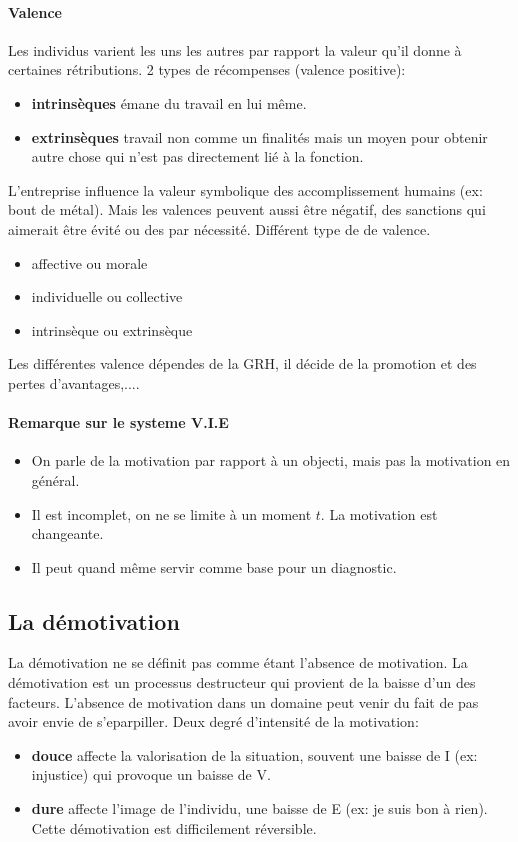 \documentclass[11pt]{article} %
\begin{document}
		 \paragraph{Valence} Les individus varient les uns les autres par rapport la valeur qu'il donne à 
		 certaines rétributions. 2 types de récompenses (valence positive):
		 \begin{itemize}
		 	\item \textbf{intrinsèques} émane du travail en lui même.
		 	\item \textbf{extrinsèques} travail non comme un finalités mais un moyen pour obtenir autre 
		 	chose qui n'est pas directement lié à la fonction.
		 \end{itemize}
		 L'entreprise influence la valeur symbolique des accomplissement humains (ex: bout de métal). Mais les
		 valences peuvent aussi être négatif, des sanctions qui aimerait être évité ou des par nécessité. 
		 Différent type de de valence.
		 \begin{multicols}{2}
		 	\begin{itemize}
		 		\item affective ou morale
		 		\item individuelle ou collective
		 		\item intrinsèque ou extrinsèque
		 	\end{itemize}
		 \end{multicols}
		 Les différentes valence dépendes de la GRH, il décide de la promotion et des pertes d'avantages,....
		 \paragraph{Remarque sur le systeme V.I.E}
		 \begin{itemize}
		 	\item On parle de la motivation par rapport à un objecti, mais pas la motivation en général.
		 	\item Il est incomplet, on ne se limite à un moment $t$. La motivation est changeante.
		 	\item Il peut quand même servir comme base pour un diagnostic.
		 \end{itemize}
	\subsection{La démotivation}
		La démotivation ne se définit pas comme étant l'absence de motivation. La démotivation est un
		processus destructeur qui provient de la baisse d'un des facteurs. L'absence de motivation dans un 
		domaine peut venir du fait de pas avoir envie de s'eparpiller. Deux degré d'intensité de la motivation:
		\begin{itemize}
			\item \textbf{douce} affecte la valorisation de la situation, souvent une baisse de I (ex: injustice) 
			qui 	provoque un baisse de V.
			\item \textbf{dure} affecte l'image de l'individu, une baisse de E (ex: je suis bon à rien). Cette 
			démotivation est difficilement réversible.
		\end{itemize}
\end{document}
